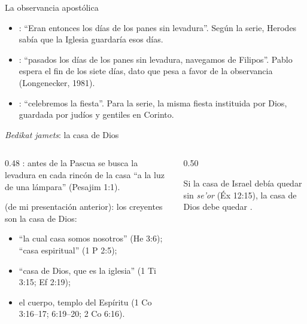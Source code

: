 \begin{frame}{La observancia apostólica}
\small
\begin{itemize}
\item {}: ``Eran entonces los días de los panes sin levadura''. Según la serie, Herodes sabía que la Iglesia guardaría esos días.\\
\item {}: ``pasados los días de los panes sin levadura, navegamos de Filipos''. Pablo espera el fin de los siete días, dato que pesa a favor de la observancia (Longenecker, 1981).
\item {}: ``celebremos la fiesta''. Para la serie, la misma fiesta instituida por Dios, guardada por judíos y gentiles en Corinto.
\end{itemize}
\end{frame}

\begin{frame}{\emph{Bedikat jamets}: la casa de Dios}
\begin{columns}[t,onlytextwidth]
\begin{column}{0.48\textwidth}\small
{}: antes de la Pascua se busca la levadura en cada rincón de la casa ``a la luz de una lámpara'' (Pesajim 1:1).\par\medskip
{} (de mi presentación anterior): los creyentes son la casa de Dios:
\begin{itemize}
\item ``la cual casa somos nosotros'' (He 3:6); ``casa espiritual'' (1 P 2:5);
\item ``casa de Dios, que es la iglesia'' (1 Ti 3:15; Ef 2:19);
\item el cuerpo, templo del Espíritu (1 Co 3:16--17; 6:19--20; 2 Co 6:16).
\end{itemize}
\end{column}
\begin{column}{0.50\textwidth}
\begin{tcolorbox}[colback=papiro,colframe=tierraroja,boxrule=1pt,arc=3pt]
\small\centering Si la casa de Israel debía quedar sin \emph{se'or} (Éx 12:15), la casa de Dios debe quedar .
\end{tcolorbox}
\end{column}
\end{columns}
\end{frame}

